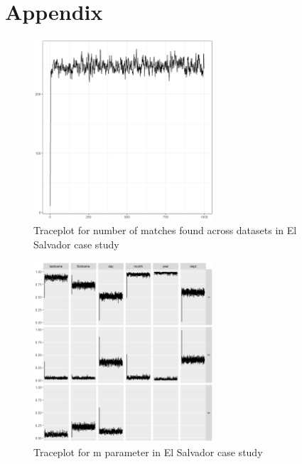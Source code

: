 \documentclass[12pt,letterpaper]{article}
\newcommand{\1}[1]{\mathbb{I}\!\left[#1\right]} %
\begin{document}
\bigskip

\section{Appendix}
\label{sec:appendix}

\begin{figure}[t]
	
	{\centering \includegraphics[width=0.6\textwidth]{../notes/figures/el_salvador/overlap_trace} 
		
	}
	
	\caption{Traceplot for number of matches found across datasets in El Salvador case study}\label{fig:overlap_trace}
\end{figure}

\begin{figure}[t]
	
	{\centering \includegraphics[width=0.6\textwidth]{../notes/figures/el_salvador/m_trace} 
		
	}
	
	\caption{Traceplot for m parameter in El Salvador case study}\label{fig:m_trace}
\end{figure}
\end{document}
